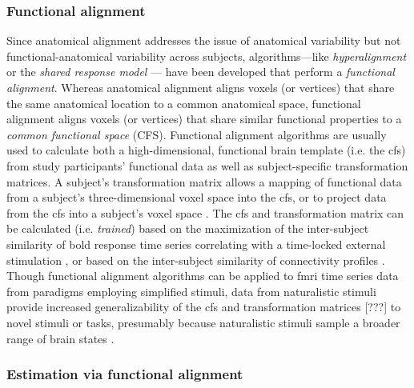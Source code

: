 \subsubsection{Functional alignment}
%
Since anatomical alignment addresses the issue of anatomical variability but not
functional-anatomical variability across subjects, algorithms---like
\textit{hyperalignment} \citep{haxby2011common, guntupalli2016model} or the
\textit{shared response model} \citep{chen2015reduced, zhang2016searchlight}---
have been developed that perform a \textit{functional alignment}.
%
Whereas anatomical alignment aligns voxels (or vertices) that share the same
anatomical location to a common anatomical space, functional alignment aligns
voxels (or vertices) that share similar functional properties to a
\textit{common functional space} (CFS).
%
Functional alignment algorithms are usually used to calculate both a
high-dimensional, functional brain template (i.e. the \ac{cfs}) from study
participants' functional data as well as subject-specific transformation
matrices.
%
A subject's transformation matrix allows a mapping of functional data from a
subject's three-dimensional voxel space into the \ac{cfs}, or to project data
from the \ac{cfs} into a subject's voxel space \citep{haxby2020hyperalignment,
kumar2020brainiak}.
%
The \ac{cfs} and transformation matrix can be calculated (i.e.
\textit{trained}) based on the maximization of the inter-subject similarity of
\ac{bold} response time series correlating with a time-locked external
stimulation \citep{haxby2011common, chen2015reduced, sabuncu2010function}, or
based on the inter-subject similarity of connectivity profiles
\citep{feilong2018reliable, guntupalli2018computational, nastase2019leveraging}.
%
Though functional alignment algorithms can be applied to \ac{fmri} time series
data from paradigms employing simplified stimuli, data from naturalistic stimuli
provide
%
increased generalizability of the \ac{cfs}
%
and transformation matrices [???]
%
to novel stimuli or tasks, presumably because naturalistic stimuli sample a
broader range of brain states \citep{haxby2011common, guntupalli2016model}.






\subsubsection{Estimation via functional alignment}

